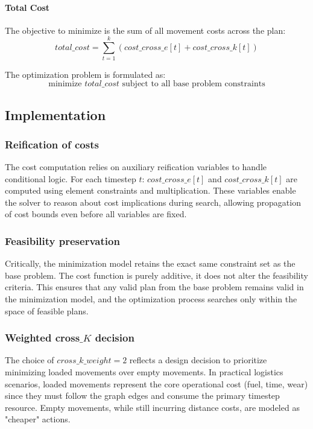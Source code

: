 \documentclass[a4paper,12pt]{article}
\begin{document}
\paragraph{Total Cost} The objective to minimize is the sum of all movement costs across the plan:
$$total\_cost = \sum_{t=1}^{k} \left( cost\_cross\_e[t] + cost\_cross\_k[t] \right)$$

The optimization problem is formulated as:
$$\text{minimize } total\_cost \text{ subject to all base problem constraints}$$

\subsection{Implementation}

\subsubsection{Reification of costs}

The cost computation relies on auxiliary reification variables to handle conditional logic. For each timestep $t$: $cost\_cross\_e[t]$ and $cost\_cross\_k[t]$ are computed using element constraints and multiplication.
These variables enable the solver to reason about cost implications during search, allowing propagation of cost bounds even before all variables are fixed.

\subsubsection{Feasibility preservation}

Critically, the minimization model retains the exact same constraint set as the base problem. The cost function is purely additive, it does not alter the feasibility criteria. This ensures that any valid plan from the base problem remains valid in the minimization model, and the optimization process searches only within the space of feasible plans.

\subsubsection{Weighted cross$\_K$ decision}

The choice of $cross\_k\_weight = 2$ reflects a design decision to prioritize minimizing loaded movements over empty movements. In practical logistics scenarios, loaded movements represent the core operational cost (fuel, time, wear) since they must follow the graph edges and consume the primary timestep resource. Empty movements, while still incurring distance costs, are modeled as "cheaper" actions.
\end{document}
